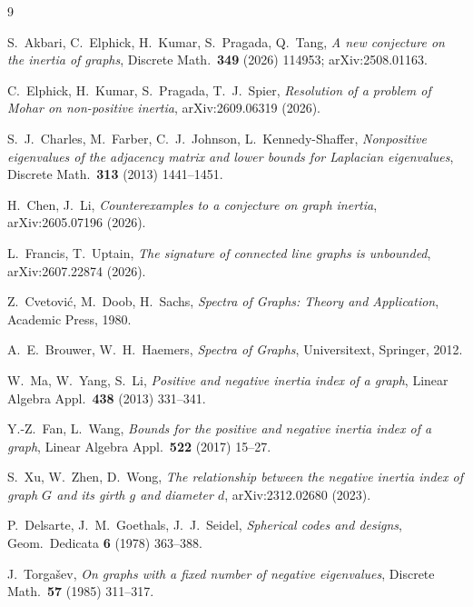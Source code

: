 \documentclass[11pt,a4paper]{article}
\theoremstyle{plain}
\theoremstyle{definition}
\begin{document}
\begin{thebibliography}{9}

S.~Akbari, C.~Elphick, H.~Kumar, S.~Pragada, Q.~Tang,
\emph{A new conjecture on the inertia of graphs}, Discrete Math.\ \textbf{349} (2026)
114953; arXiv:2508.01163.

C.~Elphick, H.~Kumar, S.~Pragada, T.~J.~Spier,
\emph{Resolution of a problem of Mohar on non-positive inertia}, arXiv:2609.06319 (2026).

S.~J.~Charles, M.~Farber, C.~J.~Johnson, L.~Kennedy-Shaffer, \emph{Nonpositive
eigenvalues of the adjacency matrix and lower bounds for Laplacian eigenvalues},
Discrete Math.\ \textbf{313} (2013) 1441--1451.

H.~Chen, J.~Li, \emph{Counterexamples to a conjecture on graph inertia}, arXiv:2605.07196
(2026).

L.~Francis, T.~Uptain, \emph{The signature of connected line graphs is unbounded},
arXiv:2607.22874 (2026).

Z.~Cvetovi\'c, M.~Doob, H.~Sachs, \emph{Spectra of Graphs: Theory and Application},
Academic Press, 1980.

A.~E.~Brouwer, W.~H.~Haemers, \emph{Spectra of Graphs}, Universitext, Springer, 2012.

W.~Ma, W.~Yang, S.~Li, \emph{Positive and negative inertia index of a graph}, Linear
Algebra Appl.\ \textbf{438} (2013) 331--341.

Y.-Z.~Fan, L.~Wang, \emph{Bounds for the positive and negative inertia index of a graph},
Linear Algebra Appl.\ \textbf{522} (2017) 15--27.

S.~Xu, W.~Zhen, D.~Wong, \emph{The relationship between the negative inertia index of
graph $G$ and its girth $g$ and diameter $d$}, arXiv:2312.02680 (2023).

P.~Delsarte, J.~M.~Goethals, J.~J.~Seidel, \emph{Spherical codes and designs},
Geom.\ Dedicata \textbf{6} (1978) 363--388.

J.~Torga{\v{s}}ev, \emph{On graphs with a fixed number of negative eigenvalues}, Discrete
Math.\ \textbf{57} (1985) 311--317.


\end{thebibliography}
\end{document}
